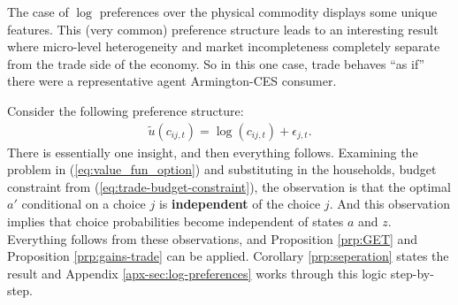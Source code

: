 \documentclass[12pt,pdftex]{article}
\begin{document}
\begin{onehalfspacing}
The case of $\log$ preferences over the physical commodity displays some unique features. This (very common) preference structure leads to an interesting result where micro-level heterogeneity and market incompleteness completely separate from the trade side of the economy. So in this one case, trade behaves ``as if'' there were a representative agent Armington-CES consumer.

Consider the following preference structure:
\begin{align}
\tilde{u}( c_{ij,t} ) =  \log(c_{ij,t}) + \epsilon_{j,t}. \nonumber
\end{align}
There is essentially one insight, and then everything follows. Examining the problem in (\ref{eq:value_fun_option}) and substituting in the households, budget constraint from (\ref{eq:trade-budget-constraint}), the observation is that the optimal $a'$ conditional on a choice $j$ is \textbf{independent} of the choice $j$. And this observation implies that choice probabilities become independent of states $a$ and $z$. Everything follows from these observations, and Proposition \ref{prp:GET} and Proposition \ref{prp:gains-trade} can be applied. Corollary \ref{prp:seperation} states the result and Appendix \ref{apx-sec:log-preferences} works through this logic step-by-step.


\end{onehalfspacing}
\end{document}
